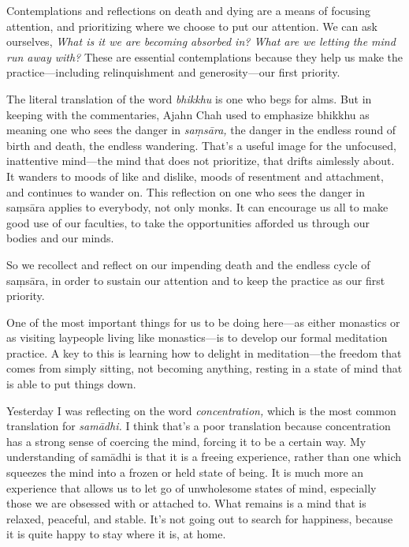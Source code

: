 
Contemplations and reflections on death and dying are a means of 
focusing attention, and prioritizing where we choose to put our 
attention. We can ask ourselves, \emph{What is it we are becoming 
absorbed in? What are we letting the mind run away with?} These are 
essential contemplations because they help us make the 
practice---including relinquishment and generosity---our first priority.

The literal translation of the word \emph{bhikkhu} is one who begs for 
alms. But in keeping with the commentaries, Ajahn Chah used to 
emphasize bhikkhu as meaning one who sees the danger in 
\emph{saṃsāra,} the danger in the endless round of birth and death, 
the endless wandering. That's a useful image for the unfocused, 
inattentive mind---the mind that does not prioritize, that drifts 
aimlessly about. It wanders to moods of like and dislike, moods of 
resentment and attachment, and continues to wander on. This reflection 
on one who sees the danger in saṃsāra applies to everybody, not only 
monks. It can encourage us all to make good use of our faculties, to 
take the opportunities afforded us through our bodies and our minds.

So we recollect and reflect on our impending death and the endless 
cycle of saṃsāra, in order to sustain our attention and to keep the 
practice as our first priority.


One of the most important things for us to be doing here---as either 
monastics or as visiting laypeople living like monastics---is to 
develop our formal meditation practice. A key to this is learning how 
to delight in meditation---the freedom that comes from simply sitting, 
not becoming anything, resting in a state of mind that is able to put 
things down.

Yesterday I was reflecting on the word \emph{concentration,} which is 
the most common translation for \emph{samādhi.} I think that's a poor 
translation because concentration has a strong sense of coercing the 
mind, forcing it to be a certain way. My understanding of samādhi is 
that it is a freeing experience, rather than one which squeezes the 
mind into a frozen or held state of being. It is much more an 
experience that allows us to let go of unwholesome states of mind, 
especially those we are obsessed with or attached to. What remains is a 
mind that is relaxed, peaceful, and stable. It's not going out to 
search for happiness, because it is quite happy to stay where it is, at 
home.

